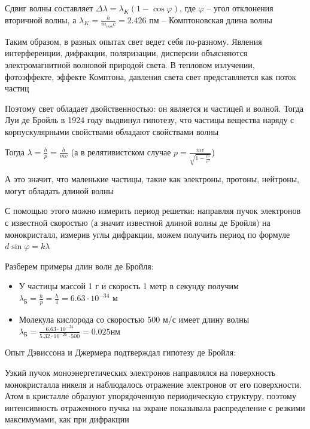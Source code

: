 \documentclass[12pt]{article}
\begin{document}
Сдвиг волны составляет $\Delta \lambda = \lambda_K (1 - \cos\varphi)$, где $\varphi$ -- угол отклонения вторичной волны, а $\lambda_K = \frac{h}{m_{\text{пок}} c} = 2.426$ пм -- Комптоновская длина волны

\mediumvspace

Таким образом, в разных опытах свет ведет себя по-разному. Явления интерференции, дифракции, поляризации, дисперсии объясняются электромагнитной волновой природой света. В тепловом излучении, фотоэффекте, эффекте Комптона, давления света свет представляется как поток частиц

Поэтому свет обладает двойственностью: он является и частицей и волной. Тогда Луи де Бройль в 1924 году выдвинул гипотезу, что частицы вещества наряду с корпускулярными свойствами обладают свойствами волны

Тогда $\lambda = \frac{h}{p} = \frac{h}{mv}$ (а в релятивистском случае $p = \frac{mv}{\sqrt{1 - \frac{v^2}{c^2}}}$)

А это значит, что маленькие частицы, такие как электроны, протоны, нейтроны, могут обладать длиной волны

С помощью этого можно измерить период решетки: направляя пучок электронов с известной скоростью (а значит известной длиной волны де Бройля) на монокристалл, измерив углы дифракции, можем получить период по формуле $d \sin \varphi = k \lambda$






Разберем примеры длин волн де Бройля:

\begin{itemize}
    \item У частицы массой 1 г и скорость 1 метр в секунду получим $\lambda_{\text{Б}} = \frac{h}{p} = \frac{h}{1} = 6.63 \cdot 10^{-34}$ м

    \item Молекула кислорода со скоростью 500 м/с имеет длину волны $\lambda_{\text{Б}} = \frac{6.63 \cdot 10^{-34}}{5.32 \cdot 10^{-26} \cdot 500} = 0.025 \text{нм}$
\end{itemize}

Опыт Дэвиссона и Джермера подтверждал гипотезу де Бройля:

Узкий пучок моноэнергетических электронов направлялся на поверхность монокристалла никеля и наблюдалось отражение электронов от его поверхности. Атом в кристалле образуют упорядоченную периодическую структуру, поэтому интенсивность отраженного пучка на экране показывала распределение с резкими максимумами, как при дифракции
\end{document}
